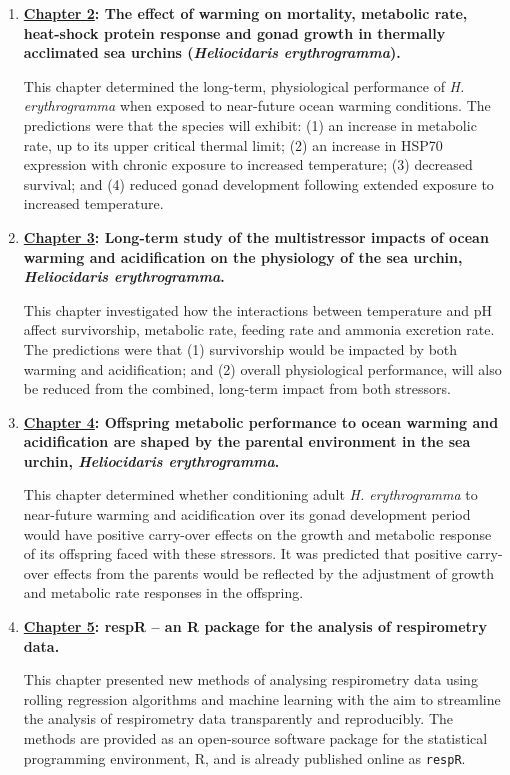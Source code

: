 \documentclass[a4paper,10pt, oneside]{memoir}
\begin{document}
\begin{enumerate}
\def\labelenumi{\arabic{enumi}.}
\item
  \textbf{\protect\hyperlink{warming}{Chapter 2}: The effect of warming on mortality, metabolic rate, heat-shock protein response and gonad growth in thermally acclimated sea urchins (\emph{Heliocidaris erythrogramma}).}

  This chapter determined the long-term, physiological performance of \emph{H. erythrogramma} when exposed to near-future ocean warming conditions. The predictions were that the species will exhibit: (1) an increase in metabolic rate, up to its upper critical thermal limit; (2) an increase in HSP70 expression with chronic exposure to increased temperature; (3) decreased survival; and (4) reduced gonad development following extended exposure to increased temperature.
\item
  \textbf{\protect\hyperlink{multistressor}{Chapter 3}: Long-term study of the multistressor impacts of ocean warming and acidification on the physiology of the sea urchin, \emph{Heliocidaris erythrogramma}.}

  This chapter investigated how the interactions between temperature and pH affect survivorship, metabolic rate, feeding rate and ammonia excretion rate. The predictions were that (1) survivorship would be impacted by both warming and acidification; and (2) overall physiological performance, will also be reduced from the combined, long-term impact from both stressors.
\item
  \textbf{\protect\hyperlink{transgen}{Chapter 4}: Offspring metabolic performance to ocean warming and acidification are shaped by the parental environment in the sea urchin, \emph{Heliocidaris erythrogramma}.}

  This chapter determined whether conditioning adult \emph{H. erythrogramma} to near-future warming and acidification over its gonad development period would have positive carry-over effects on the growth and metabolic response of its offspring faced with these stressors. It was predicted that positive carry-over effects from the parents would be reflected by the adjustment of growth and metabolic rate responses in the offspring.
\item
  \textbf{\protect\hyperlink{package}{Chapter 5}: respR -- an R package for the analysis of respirometry data.}

  This chapter presented new methods of analysing respirometry data using rolling regression algorithms and machine learning with the aim to streamline the analysis of respirometry data transparently and reproducibly. The methods are provided as an open-source software package for the statistical programming environment, R, and is already published online as \texttt{respR}.
\end{enumerate}
\end{document}
